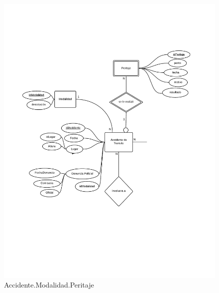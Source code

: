 \newpage
\begin{figure}
  \begin{center}
    \includegraphics[scale=0.80]{diagramas/2-1.pdf}
    \caption{Accidente.Modalidad.Peritaje}
  \end{center}
\end{figure}

